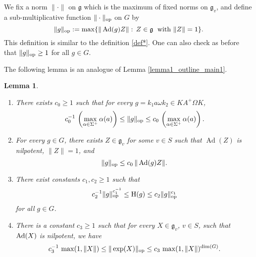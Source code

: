\documentclass[11pt,reqno,a4paper]{amsart}
\numberwithin{equation}{section}
\newcommand{\gog}{\mathfrak{g}}
\DeclareMathOperator{\Ad}{Ad}
\theoremstyle{theorem}
\newtheorem{lemma}[theorem]{Lemma}
\theoremstyle{definition}
\begin{document}
We fix a norm $\|\cdot \|$ on $\gog$ which is the maximum of fixed norms on $\gog_v$,
and define a sub-multiplicative function $\|\cdot\|_{\rm op}$ on $G$ by
\begin{equation}
\label{eq:norm00}
\|g\|_{\rm op}:= \max \{ \|\Ad(g)Z\|:\, Z\in\gog\; \hbox{ with $\|Z\|=1$}\}.
\end{equation}
This definition is similar to the definition \eqref{def*}.
One can also check as before that $\|g\|_{\rm op}\ge 1$ for all $g\in G$.

The following lemma is an analogue of Lemma \ref{lemma1_outline_main1}.

\begin{lemma}
	\label{lemma1_outline_main1_padic}
	\begin{enumerate}
		\setlength\itemsep{0.5em}
		
		\item[(i)] There exists $c_0\ge 1$ such that for every
		 $g= k_1 a \omega k_2 \in K A^+ \Omega K$,
		$$
		c_0^{-1}\, \left(\max_{\alpha \in \Sigma^{+}} \alpha(a)\right)\le \|g\|_{\rm op} \le c_0\, \left(\max_{\alpha \in \Sigma^{+}} \alpha(a)\right). 
		$$
		
		\item[(ii)] For every $g\in G$, there exists $Z\in \gog_v$ for some $v\in S$
		such that $\Ad(Z)$ is nilpotent, $\|Z\|=1$, and 
		$$
		\|g\|_{\rm op}\le c_0\,\|\Ad(g)Z\|.
		$$
		
		\item[(iii)] There exist constants $c_1,c_2\ge 1$ such that 
		\[
		c_2^{-1} \|g\|_{\rm op}^{c_1^{-1}} \leq \hbox{\rm H}(g) \leq c_2 \|g\|^{c_1}_{\rm op}
		\] 
		for all $g \in G$. 
		
		
		\item[(iv)] There is a constant $c_3 \geq 1$ such that
		for every $X \in \gog_v$, $v\in S$, such that  
		$\hbox{\rm Ad}(X)$ is nilpotent, we have
		\[
		c_3^{-1}\, \max(1,\|X\|) \leq \|\exp(X)\|_{\rm op} \leq c_3\, \max(1,\|X\|)^{\dim(G)}.
		\]
	\end{enumerate}
\end{lemma}
\end{document}
